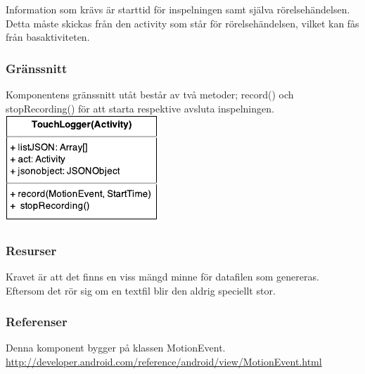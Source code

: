 Information som krävs är starttid för inspelningen samt själva rörelsehändelsen. Detta måste skickas från den activity som står för rörelsehändelsen, vilket kan fås från basaktiviteten.
\subsubsection{Gränssnitt}
Komponentens gränssnitt utåt består av två metoder; record() och stopRecording() för att starta respektive avsluta inspelningen. \\
\includegraphics[scale=1.0]{TouchLogger.pdf}
\subsubsection{Resurser}
Kravet är att det finns en viss mängd minne för datafilen som genereras. Eftersom det rör sig om en textfil blir den aldrig speciellt stor.
\subsubsection{Referenser}
Denna komponent bygger på klassen MotionEvent.
\url{http://developer.android.com/reference/android/view/MotionEvent.html}
